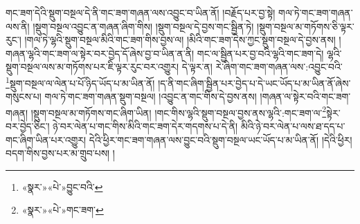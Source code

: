 གང་ཟག་དེའི་སྡུག་བསྔལ་དེ་ནི་གང་ཟག་གཞན་ལས་འབྱུང་བ་ཡིན་ནོ། །བརྗོད་པར་བྱ་སྟེ། གལ་ཏེ་གང་ཟག་གཞན་ལས་ནི། །སྡུག་བསྔལ་འབྱུང་ན་གཞན་ཞིག་གིས། །སྡུག་བསྔལ་དེ་བྱས་གང་སྦྱིན་ཏེ། །སྡུག་བསྔལ་མ་གཏོགས་ཅི་ལྟར་རུང་། །གལ་ཏེ་ལྷའི་སྡུག་བསྔལ་མིའི་གང་ཟག་གིས་བྱས་ལ། །མིའི་གང་ཟག་དེས་ཀྱང་སྡུག་བསྔལ་དེ་བྱས་ནས། །གཞན་ལྷའི་གང་ཟག་ལ་སྟེར་བར་བྱེད་དོ་ཞེས་བྱ་བ་ཡིན་ན་ནི། གང་ལ་སྦྱིན་པར་བྱ་བའི་ལྷའི་གང་ཟག་དེ། ལྷའི་སྡུག་བསྔལ་ལས་མ་གཏོགས་པར་ཇི་ལྟར་རུང་བར་འགྱུར། དེ་ལྟར་ན། རེ་ཞིག་གང་ཟག་གཞན་ལས་:འབྱུང་བའི་\footnote{«སྣར་»«པེ་»བྱུང་བའི་}སྡུག་བསྔལ་ལ་ལེན་པ་པོ་ཉིད་ཡོད་པ་མ་ཡིན་ནོ། །ད་ནི་གང་ཞིག་སྦྱིན་པར་བྱེད་པ་དེ་ཡང་ཡོད་པ་མ་ཡིན་ནོ་ཞེས་གསུངས་པ། གལ་ཏེ་གང་ཟག་གཞན་སྡུག་བསྔལ། །འབྱུང་ན་གང་གིས་དེ་བྱས་ནས། །གཞན་ལ་སྟེར་བའི་གང་ཟག་གཞན། །སྡུག་བསྔལ་མ་གཏོགས་གང་ཞིག་ཡིན། །གང་གིས་ལྷའི་སྡུག་བསྔལ་བྱས་ནས་ལྷའི་:གང་ཟག་ལ་\footnote{«སྣར་»«པེ་»གང་ཟག་}སྟེར་བར་བྱེད་ཅིང་། ཉེ་བར་ལེན་པ་གང་གིས་མིའི་གང་ཟག་དེར་གདགས་པ་དེ་ནི། མིའི་ཉེ་བར་ལེན་པ་ལས་ཐ་དད་པ་གང་ཞིག་ཡིན་པར་འགྱུར། དེའི་ཕྱིར་གང་ཟག་གཞན་ལས་བྱུང་བའི་སྡུག་བསྔལ་ཡང་ཡོད་པ་མ་ཡིན་ནོ། །དེའི་ཕྱིར། བདག་གིས་བྱས་པར་མ་གྲུབ་པས། །
